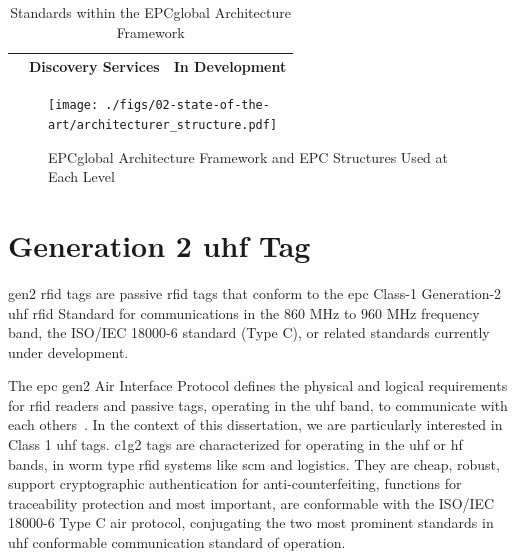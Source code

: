 \begin{table}[]
\begin{adjustwidth}{-0.09\textwidth}{0em}
\begin{tabular}{|l|l|l|}
                                                                                            & Discovery Services                                                                                                                                          & In Development                                                                                                                                                                                                                 \\ \hline
    \end{tabular}
    \end{adjustwidth}
    \caption{Standards within the EPCglobal Architecture Framework} 
    \label{tab:standards}
\end{table}

\begin{figure}[!ht]
    \centering
    \texttt{[image: ./figs/02-state-of-the-art/architecturer\_structure.pdf]}
    \caption{EPCglobal Architecture Framework and EPC Structures Used at Each Level~\cite{EPCTagData}} 
    \label{fig:archstructure}
\end{figure}

\section{Generation 2 \ac{uhf} Tag}

\ac{gen2} \ac{rfid} tags are passive \ac{rfid} tags that conform to the \ac{epc} Class-1 Generation-2 \ac{uhf} \ac{rfid} Standard for communications in the $860$ MHz to $960$ MHz frequency band, the ISO/IEC 18000-6 standard (Type C), or related standards currently under development.

The \ac{epc} \acl{gen2} Air Interface Protocol defines the physical and logical requirements for \ac{rfid} readers and passive tags, operating in the \ac{uhf} band, to communicate with each others~\cite{UHFGen2Tag}.
In the context of this dissertation, we are particularly interested in Class 1 \ac{uhf} tags. \ac{c1g2} tags are characterized for operating in the \ac{uhf} or \ac{hf}~\cite{HFClassTag} bands, in \ac{worm} type \ac{rfid} systems like \ac{scm} and logistics.
They are cheap, robust, support cryptographic authentication for anti-counterfeiting, functions for traceability protection and most important, are conformable with the ISO/IEC 18000-6 Type C air protocol, conjugating the two most prominent standards in \ac{uhf} conformable communication standard of operation.


